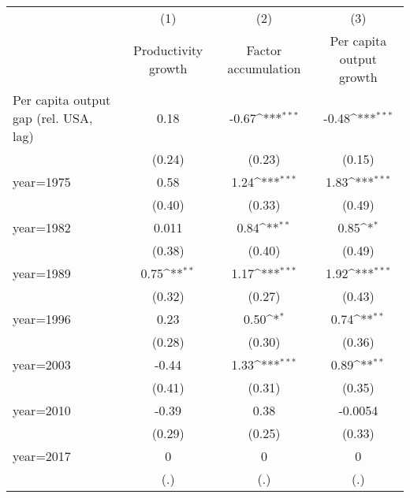 {
\def\sym#1{\ifmmode^{#1}\else\(^{#1}\)\fi}
\begin{tabular}{l*{3}{c}}
\toprule
                    &\multicolumn{1}{c}{(1)}&\multicolumn{1}{c}{(2)}&\multicolumn{1}{c}{(3)}\\
                    &\multicolumn{1}{c}{Productivity growth}&\multicolumn{1}{c}{Factor accumulation}&\multicolumn{1}{c}{Per capita output growth}\\
\midrule
Per capita output gap (rel. USA, lag)&        0.18         &       -0.67\sym{***}&       -0.48\sym{***}\\
                    &      (0.24)         &      (0.23)         &      (0.15)         \\
\addlinespace
year=1975           &        0.58         &        1.24\sym{***}&        1.83\sym{***}\\
                    &      (0.40)         &      (0.33)         &      (0.49)         \\
\addlinespace
year=1982           &       0.011         &        0.84\sym{**} &        0.85\sym{*}  \\
                    &      (0.38)         &      (0.40)         &      (0.49)         \\
\addlinespace
year=1989           &        0.75\sym{**} &        1.17\sym{***}&        1.92\sym{***}\\
                    &      (0.32)         &      (0.27)         &      (0.43)         \\
\addlinespace
year=1996           &        0.23         &        0.50\sym{*}  &        0.74\sym{**} \\
                    &      (0.28)         &      (0.30)         &      (0.36)         \\
\addlinespace
year=2003           &       -0.44         &        1.33\sym{***}&        0.89\sym{**} \\
                    &      (0.41)         &      (0.31)         &      (0.35)         \\
\addlinespace
year=2010           &       -0.39         &        0.38         &     -0.0054         \\
                    &      (0.29)         &      (0.25)         &      (0.33)         \\
\addlinespace
year=2017           &           0         &           0         &           0         \\
                    &         (.)         &         (.)         &         (.)         \\

\end{tabular}}
